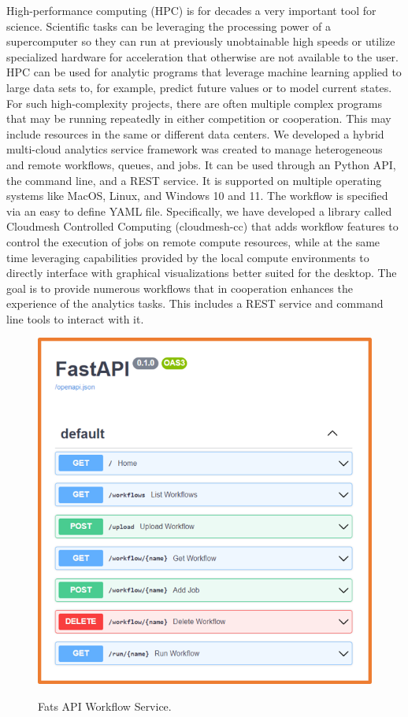 High-performance computing (HPC) is for decades a very important tool for science. Scientific tasks can be leveraging the processing power of a supercomputer so they can run at previously unobtainable high speeds or utilize specialized hardware for acceleration that otherwise are not available to the user. HPC can be used for analytic programs that leverage machine learning applied to large data sets to, for example, predict future values or to model current states. For such high-complexity projects, 
there are often multiple complex programs that may be running repeatedly in either competition or cooperation. This may include resources in the same or different data centers. We developed 
a hybrid multi-cloud analytics service framework was created to manage heterogeneous and remote workflows, queues, and jobs. It can be used through an Python API, the command line, and a REST service. It is supported on multiple operating systems like MacOS, Linux, and Windows 10 and 11. 
The workflow is specified via an easy to define YAML file.
Specifically, we have developed a library called Cloudmesh Controlled Computing (cloudmesh-cc) that adds workflow features to control the execution of jobs on remote compute resources, while at the same time leveraging capabilities provided by the local compute environments to directly interface with graphical visualizations better suited for the desktop. The goal is to provide numerous workflows that in cooperation enhances the experience of the analytics tasks. This includes a REST service and command line tools to interact with it.


\begin{figure}[htb]
\centering\includegraphics[width=0.5\columnwidth]{images/fastapi-service.png}
\label{fig:fastapi-cc}
\caption{Fats API Workflow Service.}
\end{figure}

